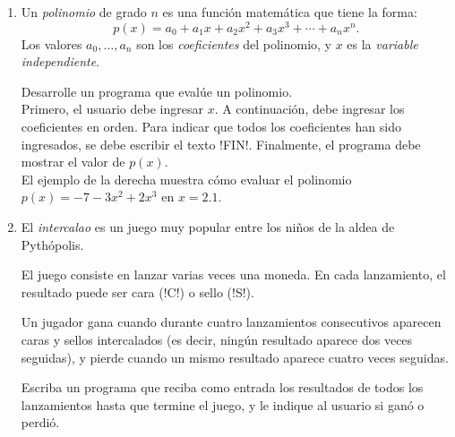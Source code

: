 \documentclass[11pt,spanish]{article}
\newcommand{\pond}[1]{[{\small\textbf{#1\%}}]}
\begin{document}
\begin{enumerate}[font=\Large\bfseries]
    \newpage
    \item
      \pond{25}
      Un \emph{polinomio} de grado \(n\)
      es una función matemática que tiene la forma:
      \[
        p(x) =
        a_0     +
        a_1 x   +
        a_2 x^2 +
        a_3 x^3 +
        \cdots +
        a_n x^n.
      \]
      Los valores \(a_0, \ldots, a_n\)
      son los \emph{coeficientes} del polinomio,
      y \(x\) es la \emph{variable independiente}.

      \begin{minipage}[t]{.63\textwidth}
        Desarrolle un programa
        que evalúe un polinomio.
        \\[1ex]
        Primero,
        el usuario debe ingresar \(x\).
        A continuación,
        debe ingresar los coeficientes en orden.
        Para indicar que todos los coeficientes han sido ingresados,
        se debe escribir el texto \li!FIN!.
        Finalmente,
        el programa debe mostrar
        el valor de \(p(x)\).
        \\[1ex]
        El ejemplo de la derecha
        muestra cómo evaluar el polinomio
        \(p(x) = -7 - 3x^2 + 2x^3\) en \(x = 2.1\).
      \end{minipage}
      \hfill
      \begin{minipage}[t]{.26\textwidth}
        
      \end{minipage}

    \newpage
    \item
      \pond{25}
      El \emph{intercalao} es un juego muy popular
      entre los niños de la aldea de Pythópolis.

      El juego consiste en lanzar varias veces una moneda.
      En cada lanzamiento,
      el resultado puede ser cara (\li!C!) o sello (\li!S!).

      Un jugador gana cuando durante cuatro lanzamientos consecutivos
      aparecen caras y sellos intercalados
      (es decir, ningún resultado aparece dos veces seguidas),
      y pierde cuando un mismo resultado aparece
      cuatro veces seguidas.

      Escriba un programa que reciba como entrada
      los resultados de todos los lanzamientos
      hasta que termine el juego,
      y le indique al usuario si ganó o perdió.

      \begin{minipage}[t]{.26\textwidth}
        
      \end{minipage}
      \hspace{1em}
      \begin{minipage}[t]{.26\textwidth}
        
      \end{minipage}

  \end{enumerate}
\end{document}
